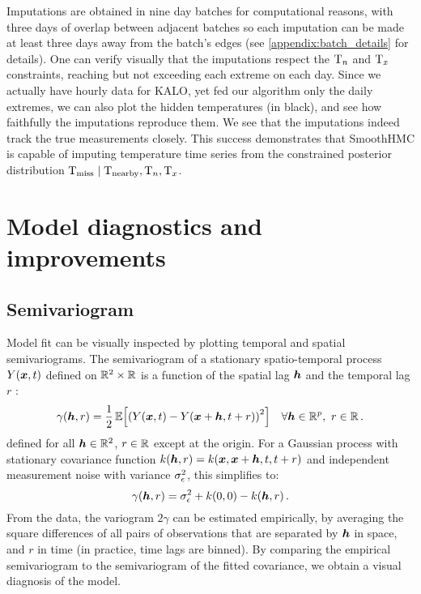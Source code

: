 Imputations are obtained in nine day batches for computational reasons, with three days of overlap between adjacent batches so each imputation can be made at least three days away from the batch's edges (see \autoref{appendix:batch_details} for details).
One can verify visually that the imputations respect the \(\mathrm{T}_{n}\) and \(\mathrm{T}_{x}\) constraints, reaching but not exceeding each extreme on each day.
Since we actually have hourly data for KALO, yet fed our algorithm only the daily extremes, we can also plot the hidden temperatures (in black), and see how faithfully the imputations reproduce them.
We see that the imputations indeed track the true measurements closely.
This success demonstrates that SmoothHMC is capable of imputing temperature time series from the constrained posterior distribution \(\mathrm{T}_{\mathrm{miss}} \mid \mathrm{T}_{\mathrm{nearby}}, \mathrm{T}_{n}, \mathrm{T}_{x}\).

\section{Model diagnostics and improvements}
\label{sec:diagnostics}

\subsection{Semivariogram}
\label{sec:semivariogram}

Model fit can be visually inspected by plotting temporal and spatial semivariograms. 
The semivariogram  of a stationary spatio-temporal process \(Y(\bm{x},t)\) defined on \(\mathbb{R}^2 \times \mathbb{R}\) is a function of the spatial lag \(\bm{h}\) and the temporal lag \(r\) \citep[see for example][chapter 6]{sherman2011spatial}:
\begin{equation}
    \gamma\del{\hvec,r} = 
    \frac{1}{2} \E\sbr{\del{Y\del{\xvec,t}-Y\del{\xvec+\hvec,t+r}}^2}
    \quad
    \forall \hvec \in \reals^p,\ r \in \reals
    \,.
\end{equation}
defined for all \(\bm{h} \in \mathbb{R}^2\), \(r \in \mathbb{R}\) except at the origin.
For a Gaussian process with stationary covariance function \(k(\bm{h},r)=k(\bm{x},\bm{x}+\bm{h},t,t+r)\) and independent measurement noise with variance $\sigma_{\epsilon}^2$, this simplifies to:
\begin{equation}
    \label{eq:gp_variogram}
    \gamma\del{\hvec,r} = \sigman^2 + k\del{0,0} - k(\hvec,r)\,.
\end{equation}
From the data, the variogram $2\gamma$ can be estimated empirically, by averaging the square differences of all pairs of observations that are separated by \(\bm{h}\) in space, and \(r\) in time (in practice, time lags are binned).
By comparing the empirical semivariogram to the semivariogram of the fitted covariance, we obtain a visual diagnosis of the model.

